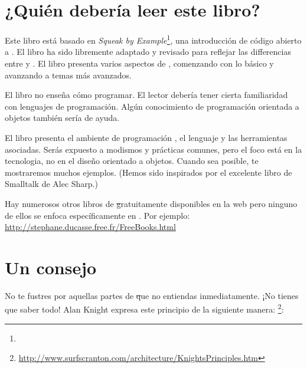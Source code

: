 \documentclass[a4paper,spanish, 10pt,twoside]{book}
\begin{document}
\section*{¿Quién debería leer este libro?}

Este libro está basado en \emph{Squeak by Example}\footnote{\sbe}, una introducción de código abierto a \squeak.
El libro ha sido libremente adaptado y revisado para reflejar las differencias entre \pharo y \squeak.
El libro presenta varios aspectos de \pharo, comenzando con lo básico y avanzando a temas más avanzados.

El libro no enseña cómo programar. El lector debería tener cierta familiaridad con lenguajes de programación. Algún conocimiento de programación orientada a objetos también sería de ayuda.

El libro presenta el ambiente de programación \pharo, el lenguaje y las herramientas asociadas. Serás expuesto a modismos y prácticas comunes, pero el foco está en la tecnologia, no en el diseño orientado a objetos. Cuando sea posible, te mostraremos muchos ejemplos. (Hemos sido inspirados por el excelente libro de Smalltalk\cite{Shar97a} de Alec Sharp.)

Hay numerosos otros libros  de \st gratuitamente disponibles en la web pero ninguno de ellos se enfoca específicamente en \pharo. Por ejemplo:
\url{http://stephane.ducasse.free.fr/FreeBooks.html}

\ifluluelse{}{\newpage} %
\section*{Un consejo}


No te fustres por aquellas partes de \st que no entiendas inmediatamente.
¡No tienes que saber todo!
Alan Knight expresa este principio de la siguiente manera: \footnote{\url{http://www.surfscranton.com/architecture/KnightsPrinciples.htm}}:
\end{document}
